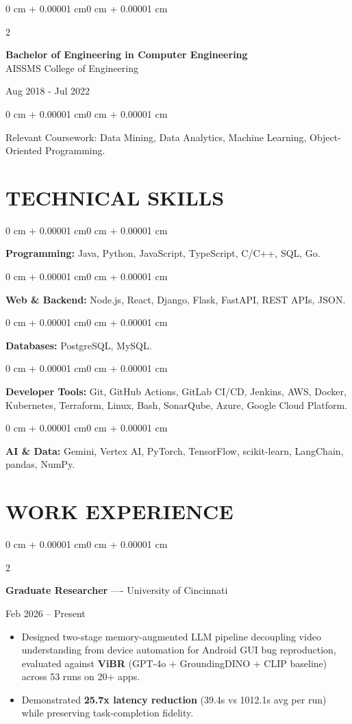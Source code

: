 \documentclass[10pt, letterpaper]{article}
\newenvironment{highlights}{
    \begin{itemize}[
        topsep=0.10 cm,
        parsep=0.06 cm,
        partopsep=0pt,
        itemsep=0.06 cm,
        leftmargin=12pt
    ]
}{
    \end{itemize}
}
\newenvironment{onecolentry}{
    \begin{adjustwidth}{0 cm + 0.00001 cm}{0 cm + 0.00001 cm}
}{
    \end{adjustwidth}
}
\newenvironment{twocolentry}[2][]{
    \onecolentry
    \def\secondColumn{#2}
    \setcolumnwidth{\fill, 4.5 cm}
    \begin{paracol}{2}
}{
    \switchcolumn \raggedleft \secondColumn
    \end{paracol}
    \endonecolentry
}
\begin{document}
\begin{twocolentry}{
    Aug 2018 - Jul 2022
}
    \textbf{Bachelor of Engineering in Computer Engineering} \\
    AISSMS College of Engineering
\end{twocolentry}
\begin{onecolentry}
Relevant Coursework: Data Mining, Data Analytics, Machine Learning, Object-Oriented Programming.
\end{onecolentry}
\section{TECHNICAL SKILLS}
\begin{onecolentry}
\textbf{Programming:} Java, Python, JavaScript, TypeScript, C/C++, SQL, Go.
\end{onecolentry}
\vspace{0.06 cm}
\begin{onecolentry}
\textbf{Web \& Backend:} Node.js, React, Django, Flask, FastAPI, REST APIs, JSON.
\end{onecolentry}
\vspace{0.06 cm}
\begin{onecolentry}
\textbf{Databases:} PostgreSQL, MySQL.
\end{onecolentry}
\vspace{0.06 cm}
\begin{onecolentry}
\textbf{Developer Tools:} Git, GitHub Actions, GitLab CI/CD, Jenkins, AWS, Docker, Kubernetes, Terraform, Linux, Bash, SonarQube, Azure, Google Cloud Platform.
\end{onecolentry}
\vspace{0.06 cm}
\begin{onecolentry}
\textbf{AI \& Data:} Gemini, Vertex AI, PyTorch, TensorFlow, scikit-learn, LangChain, pandas, NumPy.
\end{onecolentry}

\section{WORK EXPERIENCE}
\begin{twocolentry}{Feb 2026 -- Present}
\textbf{Graduate Researcher} ---- University of Cincinnati
\end{twocolentry}
\begin{highlights}
  \item Designed two-stage memory-augmented LLM pipeline decoupling video understanding from device automation for Android GUI bug reproduction, evaluated against \textbf{ViBR} (GPT-4o + GroundingDINO + CLIP baseline) across 53 runs on 20+ apps.
  \item Demonstrated \textbf{25.7x latency reduction} (39.4s vs 1012.1s avg per run) while preserving task-completion fidelity.
\end{highlights}
\end{document}
